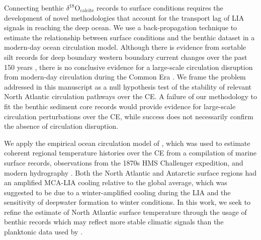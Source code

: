 \documentclass[draft]{agujournal2019}
\begin{document}
Connecting benthic
$\delta^{18}\mathrm{O}_{\mathrm{calcite}}$ records to
surface conditions requires the development of novel methodologies that
account for the transport lag of LIA signals in reaching the deep ocean. We use a
  back-propagation technique to estimate the relationship between surface conditions
  and the benthic dataset in a modern-day ocean circulation model.
   Although there is evidence from sortable silt records for deep
  boundary western boundary current changes over the past 150 years
  \cite{Thornalley-Oppo-2018:Anomalously}, there is no conclusive evidence for a
  large-scale circulation disruption from
  modern-day circulation during the Common Era \cite{Moffa-Sanchez-Hall-2015:Changes, Lippold2019}.
  We frame the problem addressed in this manuscript as a null hypothesis
  test of the stability of relevant North Atlantic circulation pathways over the
  CE. A failure of our methodology to fit the benthic sediment core records would
  provide evidence for
  large-scale circulation perturbations over the CE, while success does not necessarily
  confirm the absence of circulation disruption.

We apply the empirical
ocean circulation model of
, which was used to estimate coherent
regional temperature histories over the CE from a compilation of
marine surface records, observations from the 1870s HMS Challenger
expedition, and modern hydrography \cite{gebbie19}. Both the North
Atlantic and Antarctic surface regions had an amplified MCA-LIA
cooling relative to the global average, which was suggested to be due
to a winter-amplified cooling during the LIA and the sensitivity of
deepwater formation to winter conditions. In this work, we seek to refine the estimate of North
Atlantic surface temperature through the usage of benthic records
which may reflect more stable climatic signals than the planktonic
data used by .
\end{document}
